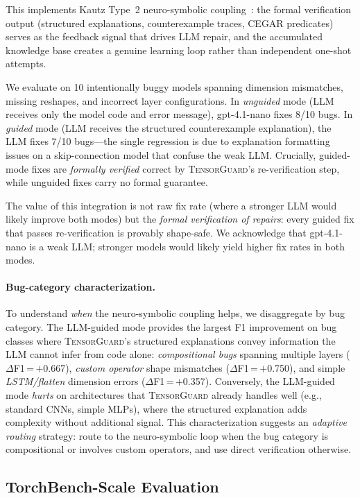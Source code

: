 \documentclass[11pt]{article}
\begin{document}
This implements Kautz Type~2 neuro-symbolic coupling~\cite{kautz22}:
the formal verification output (structured explanations,
counterexample traces, CEGAR predicates) serves as the feedback
signal that drives LLM repair, and the accumulated knowledge
base creates a genuine learning loop rather than independent
one-shot attempts.

We evaluate on 10 intentionally buggy models spanning dimension
mismatches, missing reshapes, and incorrect layer configurations.
In \emph{unguided} mode (LLM receives only the model code and error
message), gpt-4.1-nano fixes 8/10 bugs.  In \emph{guided} mode
(LLM receives the structured counterexample explanation), the LLM
fixes 7/10 bugs---the single regression is due to explanation
formatting issues on a skip-connection model that confuse the
weak LLM.  Crucially, guided-mode fixes are \emph{formally verified}
correct by \textsc{TensorGuard}'s re-verification step, while
unguided fixes carry no formal guarantee.

The value of this integration is not raw fix rate (where a stronger
LLM would likely improve both modes) but the \emph{formal verification
of repairs}: every guided fix that passes re-verification is
provably shape-safe.
We acknowledge that gpt-4.1-nano is a weak LLM; stronger models
would likely yield higher fix rates in both modes.

\paragraph{Bug-category characterization.}
To understand \emph{when} the neuro-symbolic coupling helps, we
disaggregate by bug category.  The LLM-guided mode provides the
largest F1 improvement on bug classes where \textsc{TensorGuard}'s
structured explanations convey information the LLM cannot infer
from code alone:
\emph{compositional bugs} spanning multiple layers ($\Delta$F1\,=\,$+$0.667),
\emph{custom operator} shape mismatches ($\Delta$F1\,=\,$+$0.750),
and simple \emph{LSTM/flatten} dimension errors ($\Delta$F1\,=\,$+$0.357).
Conversely, the LLM-guided mode \emph{hurts} on architectures that
\textsc{TensorGuard} already handles well (e.g., standard CNNs,
simple MLPs), where the structured explanation adds complexity
without additional signal.  This characterization suggests an
\emph{adaptive routing} strategy: route to the neuro-symbolic
loop when the bug category is compositional or involves custom
operators, and use direct verification otherwise.


\subsection{TorchBench-Scale Evaluation}\label{sec:torchbench}
\end{document}
